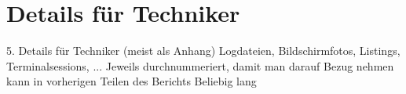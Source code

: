 \chapter{Details für Techniker}
\label{sec:details_tec}

5. Details für Techniker (meist als Anhang)
Logdateien, Bildschirmfotos, Listings, Terminalsessions, ...
Jeweils durchnummeriert, damit man darauf Bezug nehmen kann in vorherigen Teilen des Berichts
Beliebig lang